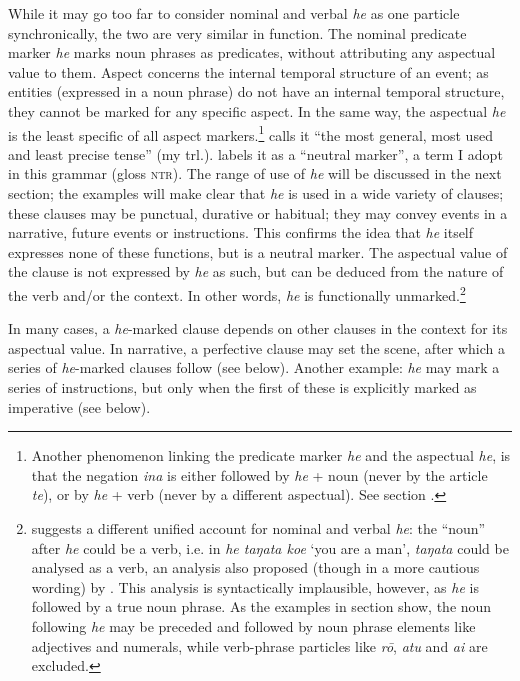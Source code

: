 While it may go too far to consider nominal and verbal \textit{he} as one particle synchronically, the two are very similar in function. The nominal predicate marker \textit{he} marks noun phrases as predicates, without attributing any aspectual value to them. Aspect concerns the internal temporal structure of an event; as entities (expressed in a noun phrase) do not have an internal temporal structure, they cannot be marked for any specific aspect. In the same way, the aspectual \textit{he} is the least specific of all aspect markers.\footnote{\label{fn:312}Another phenomenon linking the predicate marker \textit{he} and the aspectual \textit{he}, is that the negation \textit{{\ꞌ}ina} is either followed by \textit{he} + noun (never by the article \textit{te}), or by \textit{he} + verb (never by a different aspectual). See section .} \citet[64]{Englert1978} calls it “the most general, most used and least precise tense” (my trl.). \citet[153]{Chapin1978} labels it as a “neutral marker”, a term I adopt in this grammar (gloss \textsc{ntr}). The range of use of \textit{he} will be discussed in the next section; the examples will make clear that \textit{he} is used in a wide variety of clauses; these clauses may be punctual, durative or habitual; they may convey events in a narrative, future events or instructions. This confirms the idea that \textit{he} itself expresses none of these functions, but is a neutral marker. The aspectual value of the clause is not expressed by \textit{he} as such, but can be deduced from the nature of the verb and/or the context. In other words, \textit{he} is functionally unmarked.\footnote{\label{fn:313}\citet{Chapin1978} suggests a different unified account for nominal and verbal \textit{he}: the “noun” after \textit{he} could be a verb, i.e. in \textit{he taŋata koe} ‘you are a man’, \textit{taŋata} could be analysed as a verb, an analysis also proposed (though in a more cautious wording) by \citet[22]{FinneyAlexander1998}. This analysis is syntactically implausible, however, as \textit{he} is followed by a true noun phrase. As the examples in section  show, the noun following \textit{he} may be preceded and followed by noun phrase elements like adjectives and numerals, while verb-phrase particles like \textit{rō}, \textit{atu} and \textit{{\ꞌ}ai} are excluded.}  

In many cases, a \textit{he}{}-marked clause depends on other clauses in the context for its aspectual value. In narrative, a perfective clause may set the scene, after which a series of \textit{he}{}-marked clauses follow (see  below). Another example: \textit{he} may mark a series of instructions, but only when the first of these is explicitly marked as imperative (see  below).

